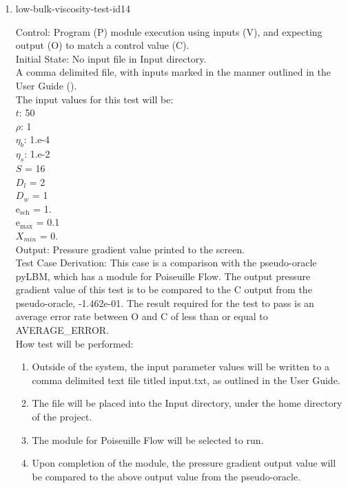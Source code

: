 \documentclass[12pt, titlepage]{article}
\begin{document}
\begin{enumerate}
\item{low-bulk-viscosity-test-id14\\}

Control: Program (P) module execution using inputs (V), and expecting output (O) to match a control value (C).\\
					
Initial State: No input file in Input directory.\\
					
A comma delimited file, with inputs marked in the manner outlined in the User Guide (\citet{LBM_UserGuide_PM}).\\The input values for this test will be:\\
$t$: 50\\
$\rho$: 1\\
$\eta_b$: 1.e-4\\
$\eta_s$: 1.e-2\\
$S$ = 16\\
$D_{l}$ = 2\\
$D_{w}$ = 1\\
$\mathrm{e_{sch}}$ = 1.\\
$\mathrm{e_{max}}$ = 0.1\\
$X_{min}$ = 0.\\

					
Output: Pressure gradient value printed to the screen. \\ 

Test Case Derivation: This case is a comparison with the pseudo-oracle pyLBM, which has a module for Poiseuille Flow. The output pressure gradient value of this test is to be compared to the C output from the pseudo-oracle, -1.462e-01. The result required for the test to pass is an average error rate between O and C of less than or equal to AVERAGE\_ERROR.\\

					
How test will be performed: 

\begin{enumerate}
\item Outside of the system, the input parameter values will be written to a comma delimited text file titled input.txt, as outlined in the User Guide.
\item The file will be placed into the Input directory, under the home directory of the project.
\item The module for Poiseuille Flow will be selected to run.
\item Upon completion of the module, the pressure gradient output value will be compared to the above output value from the pseudo-oracle.
\end{enumerate}	


\end{enumerate}
\end{document}
